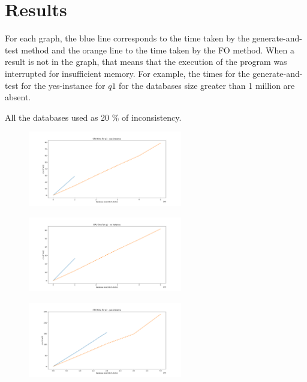 
\section{Results}

For each graph, the blue line corresponds to the time taken by the
generate-and-test method and the orange line to the time taken by the FO
method. When a result is not in the graph, that means that the execution of the
program was interrupted for insufficient memory. For example, the times for the
generate-and-test for the yes-instance for $q1$ for the databases size greater
than 1 million are absent.

All the databases used as 20 \% of inconsistency.

\begin{figure}[H]
\includegraphics[width=0.6\textwidth]{time_q1_yesinstance.png}
\centering
\end{figure}

\begin{figure}[H]
\includegraphics[width=0.6\textwidth]{time_q1_noinstance.png}
\centering
\end{figure}

\begin{figure}[H]
\includegraphics[width=0.6\textwidth]{time_q2_yesinstance.png}
\centering
\end{figure}

